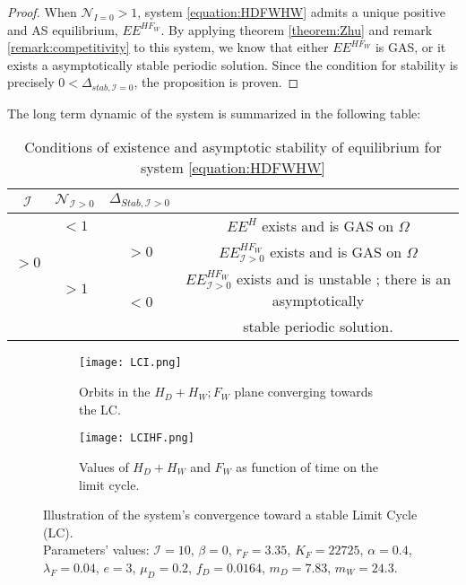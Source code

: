\documentclass{article}
\newcommand{\lfw}{\lambda_{F}}
\newcommand{\lfw}{\lambda_{F}}
\newcommand{\cI}{\mathcal{I}}
\begin{document}
\begin{proof}
When $\mathcal{N}_{I =0} > 1$, system \eqref{equation:HDFWHW} admits a unique positive and AS equilibrium, $EE^{HF_W}$. By applying theorem \ref{theorem:Zhu} and remark \ref{remark:competitivity} to this system, we know that either $EE^{HF_W}$ is GAS, or it exists a asymptotically stable periodic solution. Since the condition for stability is precisely $0 < \Delta_{stab, \cI =0}$, the proposition is proven. 
\end{proof}


The long term dynamic of the system is summarized in the following table:
\begin{table}[!ht]
\def\arraystretch{2}
\centering
\begin{tabular}{c|c|c|c}
$\cI$ & $\mathcal{N}_{\cI > 0} $ & $\Delta_{Stab, \cI > 0}$ & \\
\hline
\multirow{3}{*}{$>0$} & $<1$ & &$EE^{H}$ exists and is GAS on $\Omega$ \\
\cline{2-4}
 & \multirow{3}{*}{$> 1$}  & $>0$ &$EE^{HF_W}_{\cI>0}$ exists and is GAS on $\Omega$ \\
 \cline{3-4}
 & & \multirow{2}{*}{$ < 0$} & $EE^{HF_W}_{\cI>0}$ exists and is unstable ; there is an asymptotically \\
 & & &  stable periodic solution. \\
\end{tabular}
\caption{\centering Conditions of existence and asymptotic stability of equilibrium for system \eqref{equation:HDFWHW}}
\label{table:long term dynamic, I > 0}
\end{table}

\begin{figure}[!ht]
\begin{subfigure}{0.45\textwidth}
\centering
\texttt{[image: LCI.png]}
\caption{\centering Orbits in the $H_D + H_W ; F_W$ plane converging towards the LC.}
\label{fig:LCI, 1}
\end{subfigure}
\begin{subfigure}{0.45\textwidth}
\centering
\texttt{[image: LCIHF.png]}
\caption{\centering Values of $H_D + H_W$ and $F_W$ as function of time on the limit cycle.}
\label{fig:LCI, 2}
\end{subfigure}
\caption{ \centering Illustration of the system's convergence toward a stable Limit Cycle (LC). \\
Parameters' values: $\cI = 10$, $\beta = 0$, $r_F = 3.35$, $K_F = 22725$, $\alpha = 0.4$, $\lfw = 0.04$, $e = 3$, $\mu_D = 0.2$, $f_D = 0.0164$, $m_D = 7.83$, $m_W = 24.3$.}
\end{figure}
\end{document}
